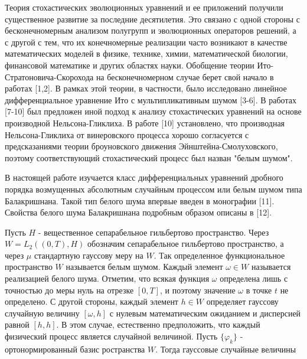 


\vzmscaption


Теория стохастических эволюционных уравнений и ее приложений получили существенное развитие за последние десятилетия. Это связано с одной стороны с бесконечномерным анализом полугрупп и эволюционных операторов решений, а с другой с тем, что их конечномерные реализации часто возникают в качестве математических моделей в физике, технике,
химии, математической биологии, финансовой математике и других областях науки. Обобщение теории Ито-Стратоновича-Скорохода на бесконечномерном случае берет свой начало в работах [1,2]. В рамках этой теории, в частности, было исследовано линейное дифференциальное уравнение Ито с мультипликативным шумом [3-6]. В работах [7-10] был
предложен иной подход к анализу стохастических уравнений на основе производной Нельсона-Гликлиха. В работе [10] установлено, что производная Нельсона-Гликлиха от винеровского процесса хорошо согласуется с предсказаниями теории броуновского движения Эйнштейна-Смолуховского, поэтому соответствующий стохастический процесс был назван "белым шумом".

В настоящей работе изучается класс дифференциальных уравнений дробного порядка возмущенных абсолютным случайным процессом или белым шумом типа Балакришнана. Такой тип белого шума впервые введен в монографии [11]. Свойства белого шума Балакришнана подробным образом описаны в [12].

Пусть $H$ - вещественное сепарабельное гильбертово пространство. Через $W=L_{2}((0,T),H)$ обозначим сепарабельное гильбертово пространство, а через $\mu$ стандартную гауссову меру на $W$. Так определенное функциональное пространство $W$ называется белым шумом. Каждый элемент $\omega\in W$ называется реализацией белого шума. Отметим, что всякая функция $\omega$ определена лишь с точностью до меры нуль на отрезке $[0, T]$, и поэтому значение $\omega$ в точке $t$ не определено. С другой стороны, каждый элемент $h\in W$ определяет гауссову случайную величину $[\omega, h]$ с нулевым математическим ожиданием и дисперсией равной $[h, h]$. В этом случае, естественно предположить, что каждый физический процесс является случайной величиной. Пусть $\{\varphi_{k}\}$ - ортонормированный базис ространства $W$. Тогда гауссовые случайные величины

